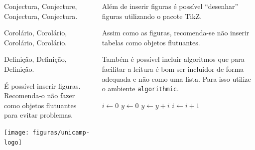 \documentclass[]{beamer}
\begin{document}
\begin{frame}[t,fragile]
\begin{columns}[t]
\begin{column}{0.4\textwidth}
      \begin{con}
        Conjectura, Conjecture, Conjectura, Conjectura.
      \end{con}

      \begin{cor}
        Corolário, Corolário, Corolário, Corolário.
      \end{cor}

      \begin{dfn}
        Definição, Definição, Definição.
      \end{dfn}

      É possível inserir figuras. Recomenda-o não fazer como objetos flutuantes
      para evitar problemas.
      \begin{center}
        \texttt{[image: figuras/unicamp-logo]}
      \end{center}
    \end{column}
    \begin{column}{0.4\textwidth}
      Além de inserir figuras é possível ``desenhar'' figuras
      utilizando o pacote TikZ.
      \begin{center}
      \end{center}

      Assim como as figuras, recomenda-se não inserir tabelas como objetos
      flutuantes.

      Também é possível incluir algoritmos que para facilitar a leitura é bom
      ser incluidor de forma adequada e não como uma lista. Para isso utilize o
      ambiente \lstinline+algorithmic+.
      \begin{algorithmic}[2]
        \STATE $i \leftarrow 0$
        \STATE $y \leftarrow 0$
        \STATE $y \leftarrow y + i$
        \STATE $i \leftarrow i + 1$
        \ENDFOR
      \end{algorithmic}


\end{column}
\end{columns}
\end{frame}
\end{document}
